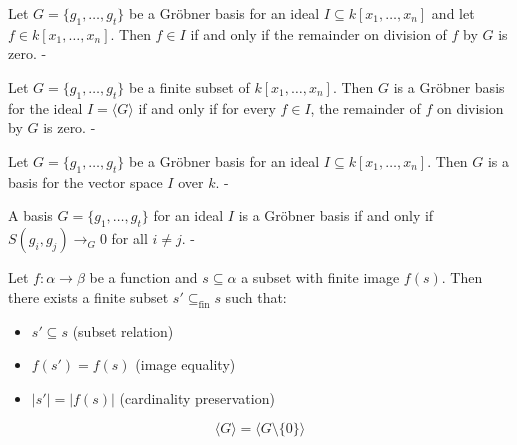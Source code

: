 \begin{lemma}\label{MonomialOrder.groebner_basis_isRemainder_zero_iff_mem_span}

  Let \( G = \{g_1, \dots, g_t\} \) be a Gröbner basis for an ideal \( I \subseteq k[x_1, \dots, x_n] \) and let \( f \in k[x_1, \dots, x_n] \). Then \( f \in I \) if and only if the remainder on division of \( f \) by \( G \) is zero.
-
\end{lemma}

\begin{lemma}\label{MonomialOrder.is_groebner_basis_iff}

  Let \( G = \{g_1, \ldots, g_t\} \) be a finite subset of \( k[x_1, \ldots, x_n] \). Then \( G \) is a Gröbner basis for the ideal \( I = \langle G \rangle \) if and only if  for every \( f \in I \), the remainder of \( f \) on division by \( G \) is zero.
-
\end{lemma}

\begin{lemma}\label{MonomialOrder.groebner_basis_is_basis}

  Let \( G = \{g_1, \ldots, g_t\} \) be a Gröbner basis for an ideal \( I \subseteq k[x_1, \ldots, x_n] \). Then \( G \) is a basis for the vector space \( I \) over \( k \).
-
\end{lemma}

\begin{lemma}\label{MonomialOrder.buchberger_criterion}

  A basis \( G = \{ g_1, \ldots, g_t \} \) for an ideal \( I \) is a Gröbner basis if and only if \( S(g_i, g_j) \to_G 0 \) for all \( i \neq j \).
-
\end{lemma}

\begin{lemma}\label{Set.finset_subset_preimage_of_finite_image}
  \leanok
  Let $f: \alpha \to \beta$ be a function and $s \subseteq \alpha$ a subset with finite image $f(s)$. Then there exists a finite subset $s' \subseteq_{\text{fin}} s$ such that:
\begin{itemize}
\item $s' \subseteq s$ (subset relation)
\item $f(s') = f(s)$ (image equality)
\item $|s'| = |f(s)|$ (cardinality preservation)
\end{itemize}

\end{lemma}

\begin{lemma}\label{Submodule.span_sdiff_singleton_zero}
  \leanok
  \[
\langle G \rangle = \langle G \setminus \{0\} \rangle
\]

\end{lemma}
